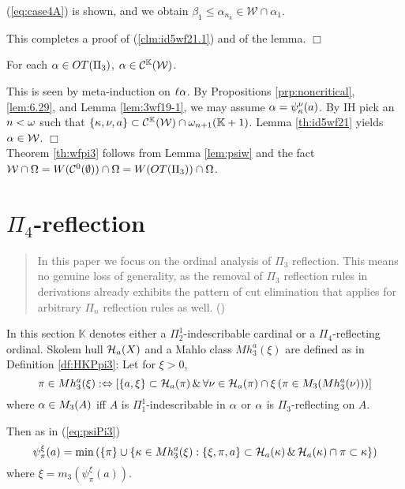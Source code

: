 \documentclass{article}
\newcommand{\mK}{\mathbb{K}}
\begin{document}
(\ref{eq:case4A}) is shown, and we obtain $\beta_{1}\leq\alpha_{n_{k}}\in\mathcal{W}\cap\alpha_{1}$.


This completes a proof of (\ref{clm:id5wf21.1}) and of the lemma.
\hspace*{\fill} $\Box$




\begin{lemma}\label{lem:psiw}
For {\rm each} $\alpha\in OT(\Pi_{3})$,
$\alp\in\mathcal{C}^{\mK}(\calw)$.
\end{lemma}
\bprf
This is seen by meta-induction on $\ell\alpha$.
By Propositions \ref{prp:noncritical}, \ref{lem:6.29}, and Lemma \ref{lem:3wf19-1},
we may assume $\alpha=\psi_{\kappa}^{\nu}(a)$.
By IH pick an $n<\omega$ such that $\{\kap,\nu,a\}\subset\mathcal{C}^{\mK}(\calw)\cap\ome_{n+1}(\mK+1)$.
Lemma \ref{th:id5wf21} yields $\alpha\in{\cal W}$.
\hspace*{\fill} $\Box$
\\

Theorem \ref{th:wfpi3} follows from Lemma \ref{lem:psiw} and
the fact ${\cal W}\cap\Omega=W(\mathcal{C}^{0}(\emptyset))\cap\Omega=W(OT(\Pi_{3}))\cap\Omega$.






\section{$\Pi_{4}$-reflection}\label{sec:pi4}
\begin{quote}
In this paper we focus on the ordinal analysis of $\Pi_{3}$ reflection.
This means no genuine loss of generality, as the removal of $\Pi_{3}$ reflection rules in derivations 
already exhibits the pattern of cut elimination that applies for arbitrary $\Pi_{n}$ reflection rules as well.
(\cite{Rathjen94})
\end{quote}

In this section $\mK$ denotes either a $\Pi^{1}_{2}$-indescribable cardinal or
a $\Pi_{4}$-reflecting ordinal.
Skolem hull ${\cal H}_{a}(X)$ and a Mahlo class $Mh_{3}^{a}(\xi)$ are defined as in
Definition \ref{df:HKPpi3}:
Let for $\xi>0$,
\[
\pi\in Mh_{3}^{a}(\xi):\Leftrightarrow
\left[
\{a,\xi\}\subset{\cal H}_{a}(\pi)  \,\&\,
\forall\nu\in{\cal H}_{a}(\pi)\cap\xi\left(
\pi\in M_{3}(Mh_{3}^{a}(\nu))
\right)
\right]
\]
where
$\alpha\in M_{3}(A)$ iff $A$ is $\Pi^{1}_{1}$-indescribable in $\alpha$ or
$\alpha$ is $\Pi_{3}$-reflecting on $A$.


Then as in (\ref{eq:psiPi3})
\[
\psi_{\pi}^{\xi}(a)=
\min\left(\{\pi\}\cup
\{\kappa\in Mh_{3}^{a}(\xi): \{\xi,\pi,a\}\subset{\cal H}_{a}(\kappa) \,\&\,
{\cal H}_{a}(\kappa)\cap\pi\subset\kappa\}
\right)
\]
where $\xi=m_{3}(\psi_{\pi}^{\xi}(a))$.
\end{document}
